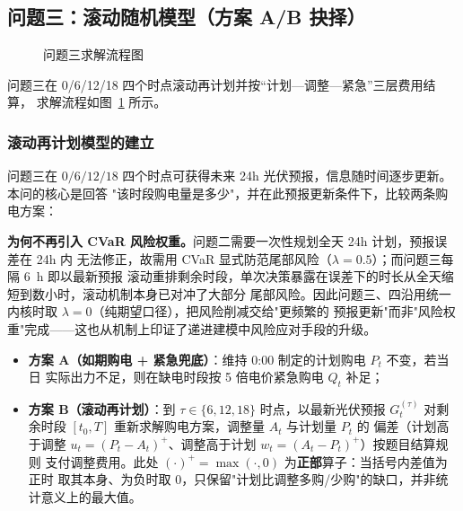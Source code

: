 \documentclass[withoutpreface]{cumcmthesis}
\begin{document}
\subsection{问题三：滚动随机模型（方案 A/B 抉择）}
\begin{figure}[H]
    \centering
    \caption{问题三求解流程图}\label{fig:flowq3}
\end{figure}
问题三在 0/6/12/18 四个时点滚动再计划并按``计划—调整—紧急''三层费用结算，
求解流程如图~\ref{fig:flowq3} 所示。

\subsubsection{滚动再计划模型的建立}
问题三在 $0/6/12/18$ 四个时点可获得未来 24h 光伏预报，信息随时间逐步更新。本问的核心是回答
"该时段购电量是多少"，并在此预报更新条件下，比较两条购电方案：

\textbf{为何不再引入 CVaR 风险权重。}问题二需要一次性规划全天 24h 计划，预报误差在 24h 内
无法修正，故需用 CVaR 显式防范尾部风险（$\lambda=0.5$）；而问题三每隔 $6$~h 即以最新预报
滚动重排剩余时段，单次决策暴露在误差下的时长从全天缩短到数小时，滚动机制本身已对冲了大部分
尾部风险。因此问题三、四沿用统一内核时取 $\lambda=0$（纯期望口径），把风险削减交给"更频繁的
预报更新"而非"风险权重"完成——这也从机制上印证了递进建模中风险应对手段的升级。

\begin{itemize}
    \item \textbf{方案 A（如期购电 + 紧急兜底）}：维持 0:00 制定的计划购电 $P_t$ 不变，若当日
          实际出力不足，则在缺电时段按 5 倍电价紧急购电 $Q_t$ 补足；
    \item \textbf{方案 B（滚动再计划）}：到 $\tau\in\{6,12,18\}$ 时点，以最新光伏预报
          $G_t^{(\tau)}$ 对剩余时段 $[t_0,T]$ 重新求解购电方案，调整量 $A_t$ 与计划量 $P_t$ 的
          偏差（计划高于调整 $u_t=(P_t-A_t)^+$、调整高于计划 $w_t=(A_t-P_t)^+$）按题目结算规则
          支付调整费用。此处 $(\cdot)^+=\max(\cdot,0)$ 为\textbf{正部}算子：当括号内差值为正时
          取其本身、为负时取 $0$，只保留"计划比调整多购/少购"的缺口，并非统计意义上的最大值。
\end{itemize}
\end{document}
